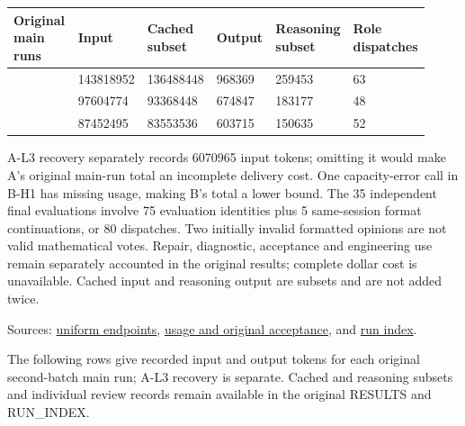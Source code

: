 \begingroup\small\setlength{\tabcolsep}{3pt}\renewcommand{\arraystretch}{1.14}
\par\nopagebreak\medskip\noindent\begin{minipage}[t]{\linewidth}
\begin{tabular}{>{\raggedright\arraybackslash}p{0.23\linewidth}>{\raggedright\arraybackslash}p{0.11\linewidth}>{\raggedright\arraybackslash}p{0.13\linewidth}>{\raggedright\arraybackslash}p{0.17\linewidth}>{\raggedright\arraybackslash}p{0.16\linewidth}>{\raggedright\arraybackslash}p{0.12\linewidth}}
\toprule
\textbf{Original main runs} & \textbf{Input} & \textbf{Cached subset} & \textbf{Output} & \textbf{Reasoning subset} & \textbf{Role dispatches}\\\midrule

{A} & {143818952} & {136488448} & {968369} & {259453} & {63}\\
{B} & {97604774} & {93368448} & {674847} & {183177} & {48}\\
{C} & {87452495} & {83553536} & {603715} & {150635} & {52}\\
\bottomrule\end{tabular}\end{minipage}\par\medskip\endgroup
A-L3 recovery separately records 6070965 input tokens; omitting it would make A's original main-run total an incomplete delivery cost. One capacity-error call in B-H1 has missing usage, making B's total a lower bound. The 35 independent final evaluations involve 75 evaluation identities plus 5 same-session format continuations, or 80 dispatches. Two initially invalid formatted opinions are not valid mathematical votes. Repair, diagnostic, acceptance and engineering use remain separately accounted in the original results; complete dollar cost is unavailable. Cached input and reasoning output are subsets and are not added twice.

Sources: \href{verification/revision23/stage2_uniform_timing_20260914.json}{uniform endpoints}, \href{verification/revision23/RESULTS.json}{usage and original acceptance}, and \href{verification/revision23/RUN_INDEX.csv}{run index}.

The following rows give recorded input and output tokens for each original second-batch main run; A-L3 recovery is separate. Cached and reasoning subsets and individual review records remain available in the original RESULTS and RUN\_INDEX.

